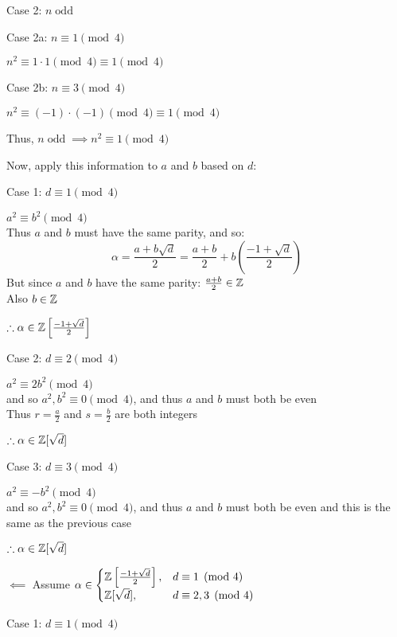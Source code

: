 \documentclass[letterpaper,12pt,fleqn]{article}
\newcommand{\sd}{\sqrt{d}}
\newcommand{\Zd}{\Z[\sd]}
\newcommand{\w}{\frac{-1+\sd}{2}}
\newcommand{\Zw}{\Z\left[\w\right]}
\renewcommand{\a}{\alpha}
\DeclareMathOperator{\odd}{odd}
\begin{document}
\begin{theproof}
\begin{description}
\begin{description}
    \item Case 2: $n \odd$
      \begin{description}
      \item Case 2a: $n\equiv1\pmod4$

        $n^2\equiv1\cdot1\pmod4\equiv1\pmod4$

      \item Case 2b: $n\equiv3\pmod4$

        $n^2\equiv(-1)\cdot(-1)\pmod4\equiv1\pmod4$
      \end{description}
      Thus, $n \odd\implies n^2\equiv1\pmod4 $
    \end{description}

    Now, apply this information to $a$ and $b$ based on $d$:
    \begin{description}
    \item Case 1: $d\equiv1\pmod4$

      $a^2\equiv b^2\pmod4$ \\
      Thus $a$ and $b$ must have the same parity, and so:
      \[\a=\frac{a+b\sd}{2}=\frac{a+b}{2}+b\left(\w\right)\]
      But since $a$ and $b$ have the same parity: $\frac{a+b}{2}\in\mathbb{Z}$ \\
      Also $b\in\mathbb{Z}$

      $\therefore\a\in\Zw$

    \item Case 2: $d\equiv2\pmod4$

      $a^2\equiv 2b^2\pmod4$ \\
      and so $a^2,b^2\equiv0\pmod4$, and thus $a$ and $b$ must both be even \\
      Thus $r=\frac{a}{2}$ and $s=\frac{b}{2}$ are both integers

      $\therefore\a\in\Zd$

    \item Case 3: $d\equiv3\pmod4$

      $a^2\equiv -b^2\pmod4$ \\
      and so $a^2,b^2\equiv0\pmod4$, and thus $a$ and $b$ must both be even
      and this is the same as the previous case

      $\therefore\a\in\Zd$
    \end{description}

  \item $\impliedby$ Assume $\a\in\begin{cases} \Zw, & d\equiv 1\pmod 4 \\
    \Zd, & d\equiv 2,3\pmod 4 \end{cases}$
    \begin{description}
    \item Case 1: $d\equiv1\pmod4$


\end{description}
\end{description}
\end{theproof}
\end{document}
